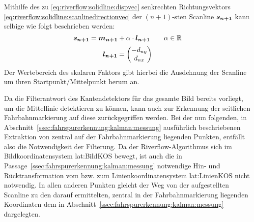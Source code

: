 Mithilfe des zu  \eqref{eq:riverflow:solidline:dispvec} senkrechten Richtungsvektors  \eqref{eq:riverflow:solidline:scanlinedirectionvec} der \begin{math} (n+1)\end{math}-sten  Scanline \begin{math} \boldsymbol{s_{n+1}} \end{math} kann selbige wie folgt beschrieben werden:
\begin{equation}
\label{eq:riverflow:solidline:scanlinecontinous}
\boldsymbol{s_{n+1}} =
\boldsymbol{m_{n+1}}  + \alpha \cdot \boldsymbol{l_{n+1}}
\qquad \alpha \in \mathbb{R}
\end{equation}
\begin{equation}
\label{eq:riverflow:solidline:scanlinedirectionvec}
\boldsymbol{l_{n+1}} =
\begin{pmatrix}
-d_{ny} \\
d_{nx}
\end{pmatrix}
\end{equation}
Der Wertebereich des skalaren Faktors \scl{\alpha} gibt hierbei die Ausdehnung der Scanline um ihren Startpunkt/Mittelpunkt  herum an.

Da die Filterantwort des Kantendetektors für das gesamte Bild bereits vorliegt, um die Mittellinie detektieren zu können, kann auch zur Erkennung der seitlichen Fahrbahnmarkierung auf diese zurückgegriffen werden. Bei der nun folgenden, in Abschnitt~\ref{ssec:fahrspurerkennung:kalman:messung} ausführlich beschriebenen Extraktion von zentral auf der Fahrbahnmarkierung liegenden Punkten, entfällt also die Notwendigkeit der Filterung. Da der Riverflow-Algorithmus sich im Bildkoordinatensystem \gls{lat:BildKOS} bewegt, ist auch die in Passage~\ref{ssec:fahrspurerkennung:kalman:messung} notwendige Hin- und Rücktransformation vom bzw. zum Linienkoordinatensystem \gls{lat:LinienKOS} nicht notwendig. In allen anderen Punkten gleicht der Weg von der aufgestellten Scanline  zu den darauf ermittelten, zentral in der Fahrbahnmarkierung liegenden Koordinaten  dem in Abschnitt~\ref{ssec:fahrspurerkennung:kalman:messung} dargelegten.

